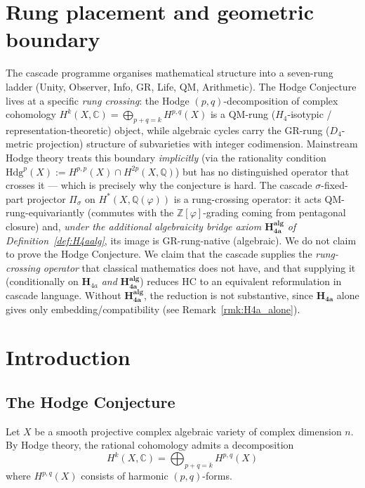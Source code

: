 \documentclass[11pt, a4paper]{amsart}
\theoremstyle{definition}
\newcommand{\C}{\mathbb{C}}
\begin{document}
\tableofcontents

\section*{Rung placement and geometric boundary}

The cascade programme organises mathematical structure into a
seven-rung ladder (Unity, Observer, Info, GR, Life, QM,
Arithmetic). The Hodge Conjecture lives at a specific \emph{rung
crossing}: the Hodge $(p,q)$-decomposition of complex cohomology
$H^k(X, \mathbb{C}) = \bigoplus_{p+q=k} H^{p,q}(X)$ is a
QM-rung ($H_4$-isotypic / representation-theoretic) object, while
algebraic cycles carry the GR-rung ($D_4$-metric projection) structure
of subvarieties with integer codimension. Mainstream Hodge theory
treats this boundary \emph{implicitly} (via the rationality
condition $\mathrm{Hdg}^p(X) := H^{p,p}(X) \cap H^{2p}(X, \mathbb{Q})$)
but has no distinguished operator that crosses it — which is
precisely why the conjecture is hard. The cascade $\sigma$-fixed-
part projector $\Pi_\sigma$ on $H^*(X, \mathbb{Q}(\varphi))$ is a
rung-crossing operator: it acts QM-rung-equivariantly (commutes
with the $\mathbb{Z}[\varphi]$-grading coming from pentagonal
closure) and, \emph{under the additional algebraicity bridge
axiom $\mathbf{H_{4a}^{alg}}$ of Definition~\ref{def:H4aalg}}, its
image is GR-rung-native (algebraic). We do not claim to prove the
Hodge Conjecture. We claim that the cascade supplies the
\emph{rung-crossing operator} that classical mathematics does not
have, and that supplying it (conditionally on $\mathbf{H}_{4a}$
\emph{and} $\mathbf{H_{4a}^{alg}}$) reduces HC to an
equivalent reformulation in cascade language. Without
$\mathbf{H_{4a}^{alg}}$, the reduction is not substantive, since
$\mathbf{H_{4a}}$ alone gives only embedding/compatibility
(see Remark~\ref{rmk:H4a_alone}).

\section{Introduction}

\subsection{The Hodge Conjecture}

Let $X$ be a smooth projective complex algebraic variety of complex
dimension $n$. By Hodge theory, the rational cohomology admits a
decomposition
\[
H^k(X, \C) = \bigoplus_{p+q = k} H^{p,q}(X)
\]
where $H^{p,q}(X)$ consists of harmonic $(p,q)$-forms.
\end{document}
